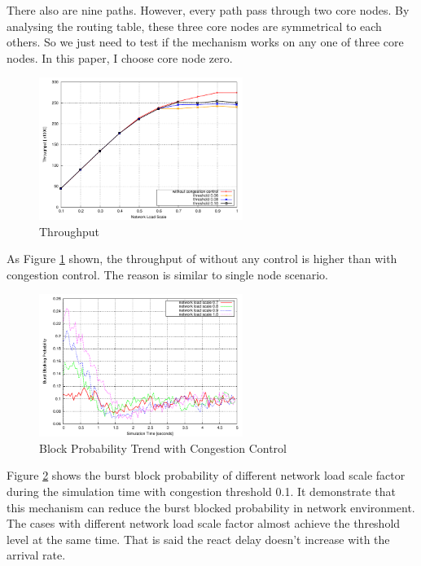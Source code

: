 There also are nine paths. However, every path pass through two core nodes. By analysing the routing table, these three core nodes are symmetrical to each others. So we just need to test if the mechanism works on any one of three core nodes. In this paper, I choose core node zero.

\begin{figure}[!htb]
\centering
\includegraphics[width=2.6in]{result/network/throughput_avg}
\caption{Throughput}
\label{fig:net_throughput}
\end{figure}

As Figure \ref{fig:net_throughput} shown, the throughput of without any control is higher than with congestion control. The reason is similar to single node scenario.

\begin{figure}[!htb]
\centering
\includegraphics[width=2.6in]{result/network/block_probability_trend}
\caption{Block Probability Trend with Congestion Control}
\label{fig:net_block_probability}
\end{figure}

Figure \ref{fig:net_block_probability} shows the burst block probability of different network load scale factor during the simulation time with congestion threshold 0.1. It demonstrate that this mechanism can reduce the burst blocked probability in network environment. The cases with different network load scale factor almost achieve the threshold level at the same time. That is said the react delay doesn't increase with the arrival rate. 


